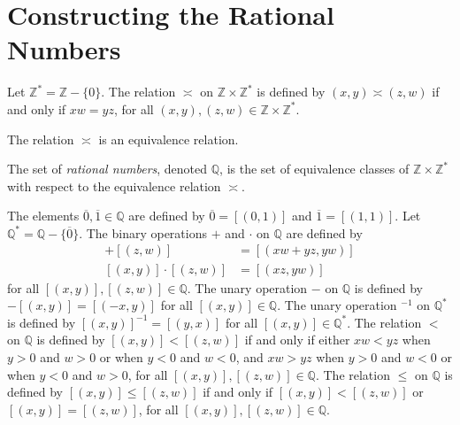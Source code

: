 \section{Constructing the Rational Numbers}
\label{rat}

\begin{definition} %
	Let $\mathbb{Z}^{*} = \mathbb{Z} - \{0\}$. The relation $\asymp$ on $\mathbb{Z} \times \mathbb{Z}^{*}$ is defined by $(x, y) \asymp (z, w)$ if and only if $x w = y z$, for all $(x, y), (z, w) \in \mathbb{Z} \times \mathbb{Z}^{*}$.
\end{definition}

\begin{lemma} %
	\label{rat:l:equiv}
	The relation $\asymp$ is an equivalence relation.
\end{lemma}

\begin{definition} %
	\label{rat:d:rat}
	The set of \emph{rational numbers}, denoted $\mathbb{Q}$, is the set of equivalence classes of $\mathbb{Z} \times \mathbb{Z}^{*}$ with respect to the equivalence relation $\asymp$.

	The elements $\overline{0}, \overline{1} \in \mathbb{Q}$ are defined by $\overline{0} = [(0, 1)]$ and $\overline{1} = [(1, 1)] .$ Let $\mathbb{Q}^{*} = \mathbb{Q} - \{\overline{0}\}$. The binary operations $+$ and $\cdot$ on $\mathbb{Q}$ are defined by
	\begin{align*}
		[(x, y)] + [(z, w)]     & = [(x w + y z, y w)] \\
		[(x, y)] \cdot [(z, w)] & = [(x z, y w)]
	\end{align*}
	for all $[(x, y)], [(z, w)] \in \mathbb{Q}$. The unary operation $-$ on $\mathbb{Q}$ is defined by $-[(x, y)] = [(-x, y)]$ for all $[(x, y)] \in \mathbb{Q}$. The unary operation $^{-1}$ on $\mathbb{Q}^{*}$ is defined by $[(x, y)]^{-1} = [(y, x)]$ for all $[(x, y)] \in \mathbb{Q}^{*}$. The relation $<$ on $\mathbb{Q}$ is defined by $[(x, y)] < [(z, w)]$ if and only if either $x w < y z$ when $y>0$ and $w > 0$ or when $y < 0$ and $w < 0$, and $x w > y z$ when $y > 0$ and $w < 0$ or when $y < 0$ and $w > 0$, for all $[(x, y)], [(z, w)] \in \mathbb{Q}$. The relation $\leq$ on $\mathbb{Q}$ is defined by $[(x, y)] \leq [(z, w)]$ if and only if $[(x, y)] < [(z, w)]$ or $[(x, y)] = [(z, w)]$, for all $[(x, y)], [(z, w)] \in \mathbb{Q}$.
\end{definition}


